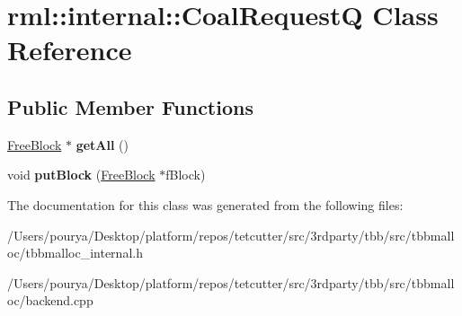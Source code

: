 \hypertarget{classrml_1_1internal_1_1CoalRequestQ}{}\section{rml\+:\+:internal\+:\+:Coal\+Request\+Q Class Reference}
\label{classrml_1_1internal_1_1CoalRequestQ}
\subsection*{Public Member Functions}
\begin{DoxyCompactItemize}
\item 
\hypertarget{classrml_1_1internal_1_1CoalRequestQ_a633263ee1695356afb097303b78b1f2d}{}\hyperlink{classrml_1_1internal_1_1FreeBlock}{Free\+Block} $\ast$ {\bfseries get\+All} ()\label{classrml_1_1internal_1_1CoalRequestQ_a633263ee1695356afb097303b78b1f2d}

\item 
\hypertarget{classrml_1_1internal_1_1CoalRequestQ_a174fb920117fcc8486700aa203987c66}{}void {\bfseries put\+Block} (\hyperlink{classrml_1_1internal_1_1FreeBlock}{Free\+Block} $\ast$f\+Block)\label{classrml_1_1internal_1_1CoalRequestQ_a174fb920117fcc8486700aa203987c66}

\end{DoxyCompactItemize}


The documentation for this class was generated from the following files\+:\begin{DoxyCompactItemize}
\item 
/\+Users/pourya/\+Desktop/platform/repos/tetcutter/src/3rdparty/tbb/src/tbbmalloc/tbbmalloc\+\_\+internal.\+h\item 
/\+Users/pourya/\+Desktop/platform/repos/tetcutter/src/3rdparty/tbb/src/tbbmalloc/backend.\+cpp\end{DoxyCompactItemize}
